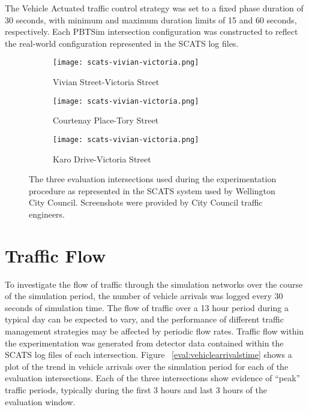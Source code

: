 The Vehicle Actuated traffic control strategy was set to a fixed phase duration of 30 seconds, with minimum and maximum duration limits of 15 and 60 seconds, respectively. Each PBTSim intersection configuration was constructed to reflect the real-world configuration represented in the SCATS log files.

\begin{figure}
\centering
\begin{subfigure}{.5\textwidth}
  \centering
  \texttt{[image: scats-vivian-victoria.png]}
  \caption{Vivian Street-Victoria Street}
  \label{fig:sub1}
\end{subfigure}%
\begin{subfigure}{.5\textwidth}
  \centering
  \texttt{[image: scats-vivian-victoria.png]}
  \caption{Courtenay Place-Tory Street}
  \label{fig:sub2}
\end{subfigure}

\vspace{1cm}

\begin{subfigure}{.5\textwidth}
  \centering
  \texttt{[image: scats-vivian-victoria.png]}
  \caption{Karo Drive-Victoria Street}
  \label{fig:sub1}
\end{subfigure}%
\caption{The three evaluation intersections used during the experimentation procedure as represented in the SCATS system used by Wellington City Council. Screenshots were provided by City Council traffic engineers. }
\label{fig:test}
\end{figure}

\section{Traffic Flow}
\label{sec:trafficflow}

To investigate the flow of traffic through the simulation networks over the course of the simulation period, the number of vehicle arrivals was logged every 30 seconds of simulation time. The flow of traffic over a 13 hour period during a typical day can be expected to vary, and the performance of different traffic management strategies may be affected by periodic flow rates. Traffic flow within the experimentation was generated from detector data contained within the SCATS log files of each intersection. Figure ~\ref{eval:vehiclearrivalstime} shows a plot of the trend in vehicle arrivals over the simulation period for each of the evaluation intersections. Each of the three intersections show evidence of ``peak'' traffic periods, typically during the first 3 hours and last 3 hours of the evaluation window.

